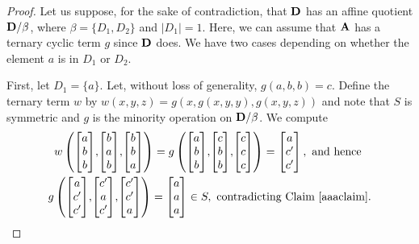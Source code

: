 \documentclass[11pt]{amsart}
\newcommand{\m}[1]{\mathbf{\uppercase{#1}}}
\theoremstyle{definition}
\theoremstyle{remark}
\theoremstyle{plain}
\begin{document}
\begin{proof}
Let us suppose, for the sake of contradiction, that $\m d$ has an affine quotient $\m d/\beta$, where $\beta=\{D_1,D_2\}$ and $|D_1|=1$.  Here, we can assume that $\m a$ has a ternary cyclic term $g$ since $\m d$ does. We have two cases depending on whether the element $a$ is in $D_1$ or $D_2$.

First, let $D_1=\{a\}$. Let, without loss of generality, $g(a,b,b)=c$. Define the ternary term $w$ by $w(x,y,z)=g(x,g(x,y,y),g(x,y,z))$ and note that $S$ is symmetric and $g$ is the minority operation on $\m d/\beta$. We compute
$$
\begin{gathered}
w\left(
\begin{bmatrix}
a \\
b \\
b
\end{bmatrix}\!,\!
\begin{bmatrix}
b \\
a \\
b
\end{bmatrix}\!,\!
\begin{bmatrix}
b \\
b \\
a
\end{bmatrix}
\right)=g\left(
\begin{bmatrix}
a \\
b \\
b
\end{bmatrix}\!,\!
\begin{bmatrix}
c \\
b \\
b
\end{bmatrix}\!,\!
\begin{bmatrix}
c \\
c \\
c
\end{bmatrix}
\right)=
\begin{bmatrix}
a \\
c' \\
c'
\end{bmatrix},\text{ and hence }\\
g\left(
\begin{bmatrix}
a \\
c' \\
c'
\end{bmatrix}\!,\!
\begin{bmatrix}
c' \\
a \\
c'
\end{bmatrix}\!,\!
\begin{bmatrix}
c' \\
c' \\
a
\end{bmatrix}
\right)=
\begin{bmatrix}
a \\
a \\
a
\end{bmatrix}\in S,
\text{ contradicting Claim~\ref{aaaclaim}.}
\end{gathered}
$$


\end{proof}
\end{document}
